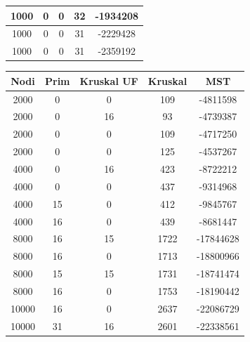 \documentclass[a4paper]{article}
\begin{document}
\begin{table}[]
\begin{minipage}[b]{10cm}
\begin{tabular}{|c|c|c|c|c|}
1000          & 0              & 0                   & 32               & -1934208     \\ \hline
1000          & 0              & 0                   & 31               & -2229428     \\ \hline
1000          & 0              & 0                   & 31               & -2359192     \\ \hline
\end{tabular}
\end{minipage}
\begin{minipage}[b]{10cm}
\begin{tabular}{|c|c|c|c|c|}
\hline
\rowcolor{gray!50}
\textbf{Nodi} & \textbf{Prim} & \textbf{Kruskal UF} & \textbf{Kruskal} & \textbf{MST} \\ \hline
2000          & 0              & 0                   & 109              & -4811598     \\ \hline
2000          & 0              & 16                  & 93               & -4739387     \\ \hline
2000          & 0              & 0                   & 109              & -4717250     \\ \hline
2000          & 0              & 0                   & 125              & -4537267     \\ \hline
4000          & 0              & 16                  & 423              & -8722212     \\ \hline
4000          & 0              & 0                   & 437              & -9314968     \\ \hline
4000          & 15             & 0                   & 412              & -9845767     \\ \hline
4000          & 16             & 0                   & 439              & -8681447     \\ \hline
8000          & 16             & 15                  & 1722             & -17844628    \\ \hline
8000          & 16             & 0                   & 1713             & -18800966    \\ \hline
8000          & 15             & 15                  & 1731             & -18741474    \\ \hline
8000          & 16             & 0                   & 1753             & -18190442    \\ \hline
10000         & 16             & 0                   & 2637             & -22086729    \\ \hline
10000         & 31             & 16                  & 2601             & -22338561    \\ \hline

\end{tabular}
\end{minipage}
\end{table}
\end{document}
